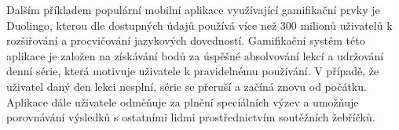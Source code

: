 Dalším příkladem populární mobilní aplikace využívající gamifikační prvky je Duolingo, kterou dle dostupných údajů používá více než 300 milionů uživatelů k rozšiřování a procvičování jazykových dovedností. Gamifikační systém této aplikace je založen na získávání bodů za úspěšné absolvování lekcí a udržování denní série, která motivuje uživatele k pravidelnému používání. V případě, že uživatel daný den lekci nesplní, série se přeruší a začíná znovu od počátku. Aplikace dále uživatele odměňuje za plnění speciálních výzev a umožňuje porovnávání výsledků s ostatními lidmi prostřednictvím soutěžních žebříčků. \cite{duolingo}
